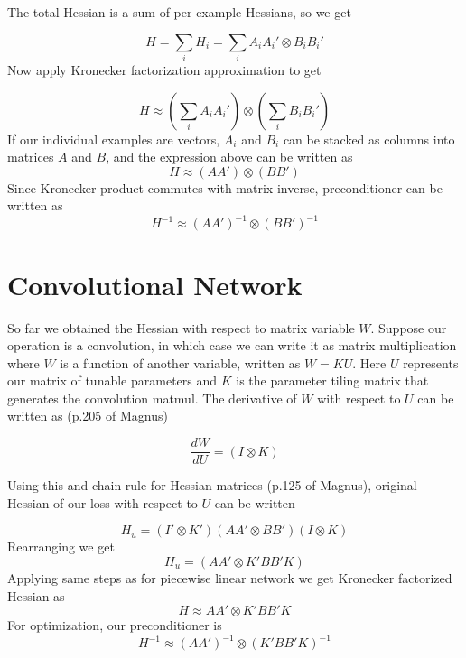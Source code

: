 \documentclass{article}
\begin{document}
The total Hessian is a sum of per-example Hessians, so we get

$$H = \sum_i H_i = \sum_i A_iA_i'\otimes B_iB_i'$$
Now apply Kronecker factorization approximation to get

$$H \approx \left(\sum_i A_iA_i'\right)\otimes \left(\sum_iB_iB_i'\right)$$
If our individual examples are vectors, $A_i$ and $B_i$ can be stacked as columns into matrices $A$ and $B$, and the expression above can be written as
$$H \approx \left(AA'\right)\otimes \left(BB'\right)$$
Since Kronecker product commutes with matrix inverse, preconditioner can be written as
$$H^{-1}\approx \left(AA'\right)^{-1}\otimes \left(BB'\right)^{-1}$$

\section*{Convolutional Network}
So far we obtained the Hessian with respect to matrix variable $W$. Suppose our operation is a convolution, in which case we can write it as matrix multiplication where $W$ is a function of another variable, written as $W=KU$. Here $U$ represents our matrix of tunable parameters and $K$ is the parameter tiling matrix that generates the convolution matmul. The derivative of $W$ with respect to $U$ can be written as (p.205 of Magnus)

$$\frac{dW}{dU} = (I\otimes K)$$

Using this and chain rule for Hessian matrices (p.125 of Magnus), original Hessian of our loss with respect to $U$ can be written 

$$H_u=(I'\otimes K')(AA'\otimes BB')(I\otimes K)$$
Rearranging we get
$$H_u=(AA'\otimes K'BB'K)$$
Applying same steps as for piecewise linear network we get Kronecker factorized Hessian as
$$H\approx AA' \otimes K'BB'K$$
For optimization, our preconditioner is
$$H^{-1}\approx \left(AA'\right)^{-1} \otimes \left(K'BB'K\right)^{-1}$$
\end{document}
